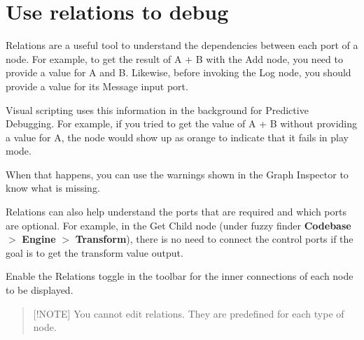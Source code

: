 \chapter{Use relations to debug}
\hypertarget{md__library_2_package_cache_2com_8unity_8visualscripting_0d1_89_82_2_documentation_0i_2vs-relations}{}\label{md__library_2_package_cache_2com_8unity_8visualscripting_0d1_89_82_2_documentation_0i_2vs-relations}
\label{md__library_2_package_cache_2com_8unity_8visualscripting_0d1_89_82_2_documentation_0i_2vs-relations_autotoc_md2067}%
%
 Relations are a useful tool to understand the dependencies between each port of a node. For example, to get the result of A + B with the Add node, you need to provide a value for A and B. Likewise, before invoking the Log node, you should provide a value for its Message input port.



Visual scripting uses this information in the background for Predictive Debugging. For example, if you tried to get the value of A + B without providing a value for A, the node would show up as orange to indicate that it fails in play mode.



When that happens, you can use the warnings shown in the Graph Inspector to know what is missing.

Relations can also help understand the ports that are required and which ports are optional. For example, in the Get Child node (under fuzzy finder {\bfseries{Codebase}} \texorpdfstring{$>$}{>} {\bfseries{ Engine}} \texorpdfstring{$>$}{>} {\bfseries{Transform}}), there is no need to connect the control ports if the goal is to get the transform value output.

Enable the Relations toggle in the toolbar for the inner connections of each node to be displayed.

\begin{quote}
\mbox{[}!\+NOTE\mbox{]} You cannot edit relations. They are predefined for each type of node. \end{quote}
